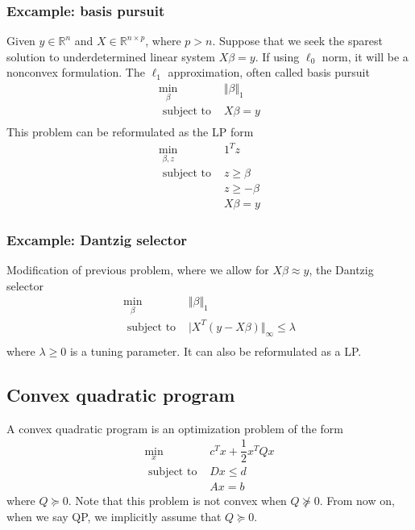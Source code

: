 \documentclass[a4paper]{article}
\begin{document}
{\subsubsection{Excample: basis pursuit}
Given $y \in \mathbb{R}^n$ and $X \in \mathbb{R}^{n \times p}$, where $p > n$. Suppose that we seek the sparest solution to underdetermined linear system $X \beta = y$. If using $\ell_0$ norm, it will be a nonconvex formulation. The $\ell_1$ approximation, often called basis pursuit
\begin{equation}
  \begin{array}{ll}
    \min\limits_{\beta} & \Vert \beta \Vert_1  \\ \nonumber
    \text { subject to } & X \beta = y \\ 
\end{array} 
\end{equation}
This problem can be reformulated as the LP form 
\begin{equation}
  \begin{array}{ll}
    \min\limits_{\beta, z} & 1^T z  \\ \nonumber
    \text { subject to } & z \geq \beta \\
    & z \geq -\beta \\
    & X \beta = y
\end{array} 
\end{equation}

\subsubsection{Excample: Dantzig selector}
Modification of previous problem, where we allow for $X \beta \approx y$, the Dantzig selector
\begin{equation}
  \begin{array}{ll}
    \min\limits_{\beta} & \Vert \beta \Vert_1  \\ \nonumber
    \text { subject to } & \vert X^T (y-X \beta)\Vert_\infty \leq \lambda \\ \nonumber
\end{array} 
\end{equation}
where $\lambda \geq 0$ is a tuning parameter. It can also be reformulated as a 
LP.

\subsection{Convex quadratic program}
\begin{defi}
  A convex quadratic program is an optimization problem of the form
  \[
  \begin{array}{ll}
      \min\limits_{x} & c^T x + \dfrac{1}{2}x^T Qx \\
      \text { subject to } & Dx \leq d \\ \nonumber
      & Ax = b
  \end{array} 
  \]
  where $Q \succeq  0$. Note that this problem is not convex when $Q \nsucceq 0$. From now on, when we say QP, we implicitly assume that $Q \succeq 0$.
\end{defi}

}
\end{document}
